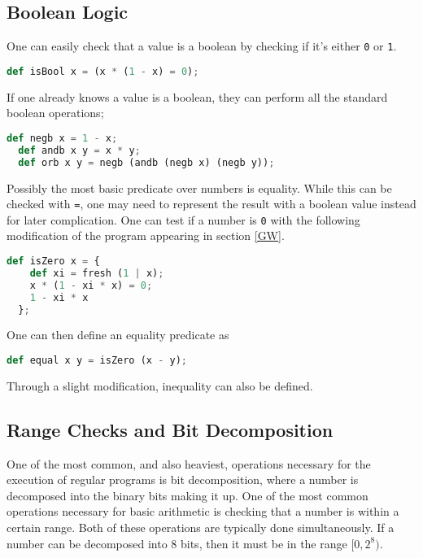 \subsection{Boolean Logic}

One can easily check that a value is a boolean by checking if it's either \lstinline{0} or \lstinline{1}.

\begin{lstlisting}[language=Python]
  def isBool x = (x * (1 - x) = 0);
\end{lstlisting}

If one already knows a value is a boolean, they can perform all the standard boolean operations;

\begin{lstlisting}[language=Python]
  def negb x = 1 - x;
  def andb x y = x * y;
  def orb x y = negb (andb (negb x) (negb y));
\end{lstlisting}

Possibly the most basic predicate over numbers is equality. While this can be checked with \lstinline{=}, one may need to represent the result with a boolean value instead for later complication. One can test if a number is \lstinline{0} with the following modification of the program appearing in section \ref{GW}.

\begin{lstlisting}[language=Python]
  def isZero x = {
    def xi = fresh (1 | x);
    x * (1 - xi * x) = 0;
    1 - xi * x
  };
\end{lstlisting}

One can then define an equality predicate as

\begin{lstlisting}[language=Python]
  def equal x y = isZero (x - y);
\end{lstlisting}

Through a slight modification, inequality can also be defined.

\subsection{Range Checks and Bit Decomposition}

One of the most common, and also heaviest, operations necessary for the execution of regular programs is bit decomposition, where a number is decomposed into the binary bits making it up. One of the most common operations necessary for basic arithmetic is checking that a number is within a certain range. Both of these operations are typically done simultaneously. If a number can be decomposed into 8 bits, then it must be in the range $[0, 2^8)$.

